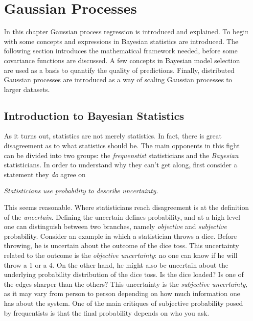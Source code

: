 \documentclass[twoside,english]{uiofysmaster}
\begin{document}
\tableofcontents



\chapter{Gaussian Processes}

In this chapter Gaussian process regression is introduced and explained. To begin with some concepts and expressions in Bayesian statistics are introduced. The following section introduces the mathematical framework needed, before some covariance functions are discussed. A few concepts in Bayesian model selection are used as a basis to quantify the quality of predictions. Finally, distributed Gaussian processes are introduced as a way of scaling Gaussian processes to larger datasets.

\section{Introduction to Bayesian Statistics}

As it turns out, statistics are not merely statistics. In fact, there is great disagreement as to what statistics should be. The main opponents in this fight can be divided into two groups: the \textit{frequenstist} statisticians and the \textit{Bayesian} statisticians. In order to understand why they can't get along, first consider a statement they \textit{do} agree on

\begin{center}
\textit{Statisticians use probability to describe uncertainty.}
\end{center}

This seems reasonable. Where statisticians reach disagreement is at the definition of the \textit{uncertain}. Defining the uncertain defines probability, and at a high level one can distinguish between two branches, namely \textit{objective} and \textit{subjective} probability. Consider an example in which a statistician throws a dice. Before throwing, he is uncertain about the outcome of the dice toss. This uncertainty related to the outcome is the \textit{objective uncertainty}: no one can know if he will throw a 1 or a 4. On the other hand, he might also be uncertain about the underlying probability distribution of the dice toss. Is the dice loaded? Is one of the edges sharper than the others? This uncertainty is the \textit{subjective uncertainty}, as it may vary from person to person depending on how much information one has about the system. One of the main critiques of subjective probability posed by frequentists is that the final probability depends on who you ask.
\end{document}
